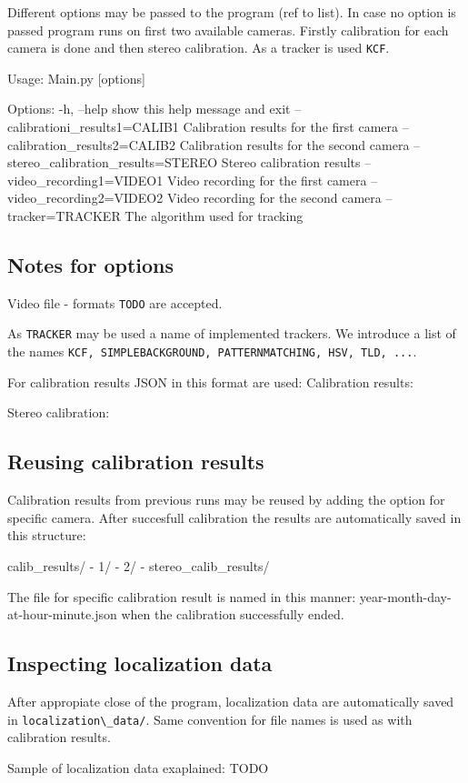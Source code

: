 Different options may be passed to the program (ref to list). In case no option
is passed program runs on first two available cameras. Firstly calibration for
each camera is done and then stereo calibration. As a tracker is used \verb+KCF+.

\begin{code}
Usage: Main.py [options]

Options:
  -h, --help            show this help message and exit
  --calibrationi\_results1=CALIB1
                        Calibration results for the first camera
  --calibration\_results2=CALIB2
                        Calibration results for the second camera
  --stereo\_calibration\_results=STEREO
                        Stereo calibration results
  --video\_recording1=VIDEO1
                        Video recording for the first camera
  --video\_recording2=VIDEO2
                        Video recording for the second camera
  --tracker=TRACKER     The algorithm used for tracking
\end{code}

\subsection{Notes for options}
Video file
- formats \verb+TODO+ are accepted.

As \verb+TRACKER+ may be used a name of implemented trackers. We introduce a list of the names \verb+KCF, SIMPLEBACKGROUND, PATTERNMATCHING, HSV, TLD, ...+.

For calibration results JSON in this format are used:
Calibration results:


Stereo calibration:
\begin{code}

\end{code}
\subsection{Reusing calibration results}
Calibration results from previous runs may be reused by adding the option for specific camera. After succesfull calibration the results are automatically saved in this structure:

\begin{code}
calib\_results/
 - 1/
 - 2/
 - stereo\_calib\_results/
\end{code} 	

The file for specific calibration result is named in this manner:
{year}-{month}-{day}-at-{hour}-{minute}.json when the calibration successfully
ended.

\subsection {Inspecting localization data}
After appropiate close of the program, localization data are automatically
saved in \verb+localization\_data/+. Same convention for file names is used as
with calibration results.

Sample of localization data exaplained:
TODO
